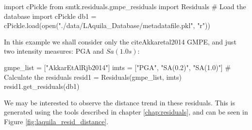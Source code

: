 \begin{python}[frame=single]
import cPickle
from smtk.residuals.gmpe_residuals import Residuals
# Load the database 
import cPickle
db1 = cPickle.load(open("./data/LAquila_Database/metadatafile.pkl",
                        "r"))
\end{python}

In this example we shall consider only the citeAkkaretal2014 GMPE, and just two intensity measures: PGA and $Sa \left( {1.0s} \right)$:

\begin{python}[frame=single]
gmpe_list = ["AkkarEtAlRjb2014"]
imts = ["PGA", "SA(0.2)", "SA(1.0)"]
# Calculate the residuals
resid1 = Residuals(gmpe_list, imts)
resid1.get_residuals(db1)
\end{python}

We may be interested to observe the distance trend in these residuals. This is generated using the tools described in chapter \ref{chap:residuals}, and can be seen in Figure \ref{fig:laquila_resid_distance}.

